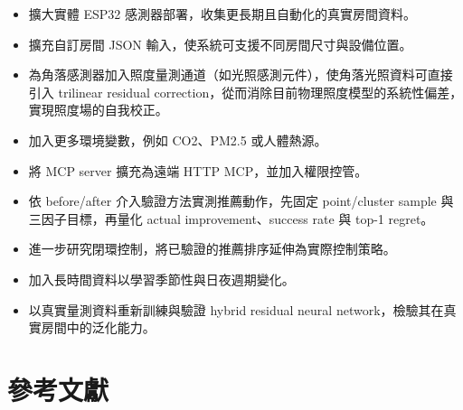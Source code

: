 \documentclass[12pt,a4paper]{article}
\begin{document}
\begin{itemize}
\item 擴大實體 ESP32 感測器部署，收集更長期且自動化的真實房間資料。
\item 擴充自訂房間 JSON 輸入，使系統可支援不同房間尺寸與設備位置。
\item 為角落感測器加入照度量測通道（如光照感測元件），使角落光照資料可直接引入 trilinear residual correction，從而消除目前物理照度模型的系統性偏差，實現照度場的自我校正。
\item 加入更多環境變數，例如 CO2、PM2.5 或人體熱源。
\item 將 MCP server 擴充為遠端 HTTP MCP，並加入權限控管。
\item 依 before/after 介入驗證方法實測推薦動作，先固定 point/cluster sample 與三因子目標，再量化 actual improvement、success rate 與 top-1 regret。
\item 進一步研究閉環控制，將已驗證的推薦排序延伸為實際控制策略。
\item 加入長時間資料以學習季節性與日夜週期變化。
\item 以真實量測資料重新訓練與驗證 hybrid residual neural network，檢驗其在真實房間中的泛化能力。
\end{itemize}

\clearpage

\section*{參考文獻}
\end{document}
